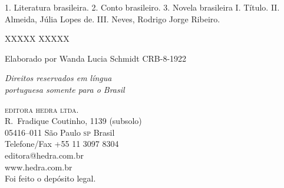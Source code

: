 {\hspace{20pt}\parbox{185pt}{1. Literatura brasileira. 2. Conto brasileiro. 3. Novela brasileira I. Título. II. Almeida, Júlia Lopes de. III. Neves, Rodrigo Jorge Ribeiro.}

\hspace{20pt} XXXXX \hspace{138pt} XXXXX

\hrulefill

\hspace{10pt}Elaborado por Wanda Lucia Schmidt CRB-8-1922

\medskip


\vfill\textit{Direitos reservados em l\'ingua\\ portuguesa somente para o Brasil}\\\medskip

%
\textsc{editora hedra ltda.}\\
R.~Fradique Coutinho, 1139 (subsolo)\\
05416--011 São Paulo \textsc{sp} Brasil\\
Telefone/Fax +55 11 3097 8304\\\smallskip
editora@hedra.com.br\\
www.hedra.com.br\\
\bigskip
Foi feito o depósito legal.\\\endgroup
\pagebreak\raggedleft
\titulagem

{\Large \autor \par\vspace{1.5ex}}
\vspace{8.5mm}

}
